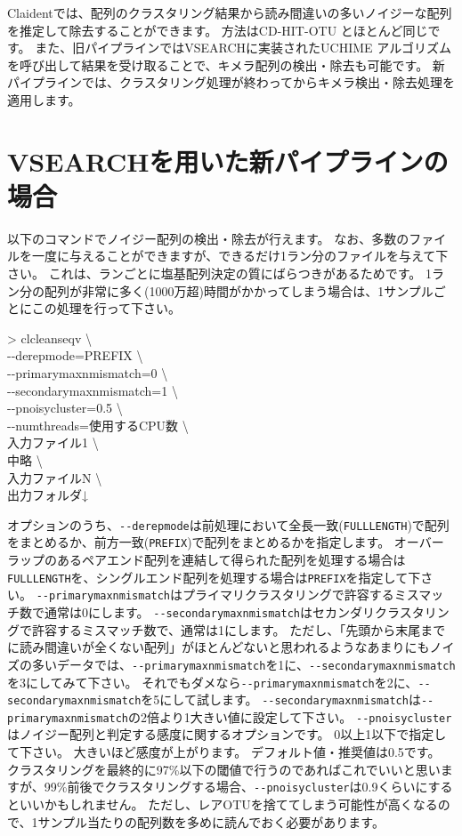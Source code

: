 \documentclass[titlepage,10pt,a4paper]{jsbook}
\newenvironment{cmd}{\begin{oframed}\raggedright\ttfamily\footnotesize\setlength{\baselineskip}{1.4em}}{\end{oframed}\vspace{-1em}}
\begin{document}
Claidentでは、配列のクラスタリング結果から読み間違いの多いノイジーな配列を推定して除去することができます。
方法はCD-HIT-OTU \citep{Li2012}とほとんど同じです。
また、旧パイプラインではVSEARCHに実装されたUCHIME \citep{Edgar2011}アルゴリズムを呼び出して結果を受け取ることで、キメラ配列の検出・除去も可能です。
新パイプラインでは、クラスタリング処理が終わってからキメラ検出・除去処理を適用します。

\section{VSEARCHを用いた新パイプラインの場合}

以下のコマンドでノイジー配列の検出・除去が行えます。
なお、多数のファイルを一度に与えることができますが、できるだけ1ラン分のファイルを与えて下さい。
これは、ランごとに塩基配列決定の質にばらつきがあるためです。
1ラン分の配列が非常に多く(1000万超)時間がかかってしまう場合は、1サンプルごとにこの処理を行って下さい。
\begin{cmd}
{\textgreater} clcleanseqv {\textbackslash}\\
{-}{-}derepmode=PREFIX {\textbackslash}\\
{-}{-}primarymaxnmismatch=0 {\textbackslash}\\
{-}{-}secondarymaxnmismatch=1 {\textbackslash}\\
{-}{-}pnoisycluster=0.5 {\textbackslash}\\
{-}{-}numthreads=使用するCPU数 {\textbackslash}\\
入力ファイル1 {\textbackslash}\\
中略 {\textbackslash}\\
入力ファイルN {\textbackslash}\\
出力フォルダ↓
\end{cmd}
オプションのうち、\texttt{{-}{-}derepmode}は前処理において全長一致(\texttt{FULLLENGTH})で配列をまとめるか、前方一致(\texttt{PREFIX})で配列をまとめるかを指定します。
オーバーラップのあるペアエンド配列を連結して得られた配列を処理する場合は\texttt{FULLLENGTH}を、シングルエンド配列を処理する場合は\texttt{PREFIX}を指定して下さい。
\texttt{{-}{-}primarymaxnmismatch}はプライマリクラスタリングで許容するミスマッチ数で通常は0にします。
\texttt{{-}{-}secondarymaxnmismatch}はセカンダリクラスタリングで許容するミスマッチ数で、通常は1にします。
ただし、「先頭から末尾までに読み間違いが全くない配列」がほとんどないと思われるようなあまりにもノイズの多いデータでは、\texttt{{-}{-}primarymaxnmismatch}を1に、\texttt{{-}{-}secondarymaxnmismatch}を3にしてみて下さい。
それでもダメなら\texttt{{-}{-}primarymaxnmismatch}を2に、\texttt{{-}{-}secondarymaxnmismatch}を5にして試します。
\texttt{{-}{-}secondarymaxnmismatch}は\texttt{{-}{-}primarymaxnmismatch}の2倍より1大きい値に設定して下さい。
\texttt{{-}{-}pnoisycluster}はノイジー配列と判定する感度に関するオプションです。
0以上1以下で指定して下さい。
大きいほど感度が上がります。
デフォルト値・推奨値は0.5です。
クラスタリングを最終的に97\%以下の閾値で行うのであればこれでいいと思いますが、99\%前後でクラスタリングする場合、\texttt{{-}{-}pnoisycluster}は0.9くらいにするといいかもしれません。
ただし、レアOTUを捨ててしまう可能性が高くなるので、1サンプル当たりの配列数を多めに読んでおく必要があります。
\end{document}
